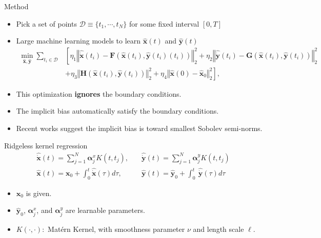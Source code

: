 \documentclass[aspectratio=169,10pt]{beamer}
\newcommand{\emphcolor}[1]{\textbf{\textcolor{emphcolorval}{#1}}}
\begin{document}
\begin{frame}{Method}
	\begin{itemize}
		\item Pick a set of points $\mathcal{D}\equiv \{t_1,\cdots,t_N\}$ for some fixed interval $[0,T]$
		\vspace{0.1in}
		\item Large machine learning models to learn $\hat{\mathbf{x}}(t)$ and $\hat{\mathbf{y}}(t)$
	\begin{align*}
		\min_{\hat{\mathbf{x}}, \hat{\mathbf{y}}} \sum_{t_i \in \mathcal{D}} &\left[\eta_1 \left\Vert \hat{\dot{\mathbf{x}}}(t_i) 
		- \mathbf{F}(\hat{\mathbf{x}}(t_i), \hat{\mathbf{y}}(t_i)(t_i)) \right\Vert_2^2 + \eta_2 \left\Vert \hat{\dot{\mathbf{y}}}(t_i) -  \mathbf{G}(\hat{\mathbf{x}}(t_i), \hat{\mathbf{y}}(t_i)) \right\Vert_2^2\right.\nonumber\\
		&\left.+ \eta_3 \left\Vert \mathbf{H}(\hat{\mathbf{x}}(t_i), \hat{\mathbf{y}}(t_i)) \right\Vert_2^2 + \eta_4 \left\Vert \hat{\mathbf{x}}(0) - \hat{\mathbf{x}}_0 \right\Vert_2^2\right],
	\end{align*}
	
	\item This optimization \emphcolor{ignores} the boundary conditions.
	 \vspace{0.1in}
	\item The implicit bias automatically satisfy the boundary conditions.
	\vspace{0.1in}
	\item Recent works suggest the implicit bias is toward smallest Sobolev semi-norms.
		\end{itemize}
\end{frame}

\begin{frame}{Ridgeless kernel regression}
\begin{align*}
	\hat{\dot{\mathbf{x}}}(t) = \sum_{j=1}^{N} \boldsymbol{\alpha}^x_j K(t,t_j), &\quad \hat{\dot{\mathbf{y}}}(t) = \sum_{j=1}^{N} \boldsymbol{\alpha}^y_jK(t,t_j)\\
	\hat{\mathbf{x}}(t) = \mathbf{x}_0+ \int_0^t \hat{\dot{\mathbf{x}}}(\tau) d\tau, &\quad \hat{\mathbf{y}}(t) = \hat{\mathbf{y}}_0+ \int_0^t \ \hat{\dot{\mathbf{y}}}(\tau) d\tau 
\end{align*}
\begin{itemize}
	\item  $\mathbf{x}_0$ is given.
	\vspace{0.1in}
	\item $\hat{\mathbf{y}}_0$, $\boldsymbol{\alpha}^x_j$, and $\boldsymbol{\alpha}^y_j$ are learnable parameters. 
	\vspace{0.1in}
	\item $K(\cdot,\cdot):$ Matérn Kernel, with smoothness parameter $\nu$ and length scale $\ell$.
\end{itemize}
\end{frame}
\end{document}
